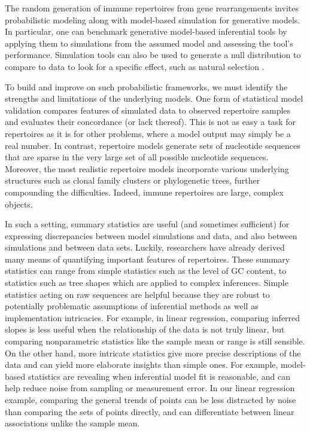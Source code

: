 \documentclass{article}
\begin{document}
The random generation of immune repertoires from gene rearrangements invites probabilistic modeling along with model-based simulation for generative models.
In particular, one can benchmark generative model-based inferential tools by applying them to simulations from the assumed model and assessing the tool's performance.
Simulation tools can also be used to generate a null distribution to compare to data to look for a specific effect, such as natural selection \cite{Yaari2012-kk}.

To build and improve on such probabilistic frameworks, we must identify the strengths and limitations of the underlying models.
One form of statistical model validation compares features of simulated data to observed repertoire samples and evaluates their concordance (or lack thereof).
This is not as easy a task for repertoires as it is for other problems, where a model output may simply be a real number.
In contrast, repertoire models generate sets of nucleotide sequences that are sparse in the very large set of all possible nucleotide sequences.
Moreover, the most realistic repertoire models incorporate various underlying structures such as clonal family clusters or phylogenetic trees, further compounding the difficulties.
Indeed, immune repertoires are large, complex objects.

In such a setting, summary statistics are useful (and sometimes sufficient) for expressing discrepancies between model simulations and data, and also between simulations and between data sets.
Luckily, researchers have already derived many means of quantifying important features of repertoires.
These summary statistics can range from simple statistics such as the level of GC content, to statistics such as tree shapes which are applied to complex inferences.
Simple statistics acting on raw sequences are helpful because they are robust to potentially problematic assumptions of inferential methods as well as implementation intricacies.
For example, in linear regression, comparing inferred slopes is less useful when the relationship of the data is not truly linear, but comparing nonparametric statistics like the sample mean or range is still sensible.
On the other hand, more intricate statistics give more precise descriptions of the data and can yield more elaborate insights than simple ones.
For example, model-based statistics are revealing when inferential model fit is reasonable, and can help reduce noise from sampling or measurement error.
In our linear regression example, comparing the general trends of points can be less distracted by noise than comparing the sets of points directly, and can differentiate between linear associations unlike the sample mean.
\end{document}
